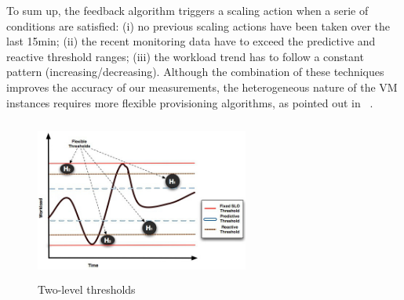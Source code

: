 To sum up, the feedback algorithm triggers a scaling action when a serie of conditions are satisfied: (i) no previous scaling actions have been taken over the last 15min; (ii) the recent monitoring data have to exceed the predictive and reactive threshold ranges; (iii) the workload trend has to follow a constant pattern (increasing/decreasing). Although the combination of these techniques improves the accuracy of our measurements, the heterogeneous nature of the VM instances requires more flexible provisioning algorithms, as pointed out in ~\cite{jiangThesis}. 


\begin{figure}[t]
\begin{center}
\includegraphics[width=7cm, height=5.3cm]{./images/thresholdGraphic.jpg}
\end{center}
\vspace{-5mm}
\caption{Two-level  thresholds}
\label{flexibleThresholds}
\end{figure}



